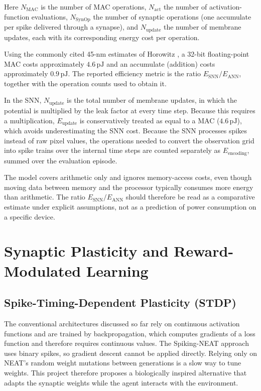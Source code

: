 Here $N_{\mathrm{MAC}}$ is the number of MAC operations, $N_{\mathrm{act}}$ the number of activation-function evaluations, $N_{\mathrm{SynOp}}$ the number of synaptic operations (one accumulate per spike delivered through a synapse), and $N_{\mathrm{update}}$ the number of membrane updates, each with its corresponding energy cost per operation.

Using the commonly cited 45-nm estimates of Horowitz \cite{horowitz2014computing}, a 32-bit floating-point MAC costs approximately $4.6\,\mathrm{pJ}$ and an accumulate (addition) costs approximately $0.9\,\mathrm{pJ}$. The reported efficiency metric is the ratio $E_{\mathrm{SNN}}/E_{\mathrm{ANN}}$, together with the operation counts used to obtain it.

In the SNN, $N_{\mathrm{update}}$ is the total number of membrane updates, in which the potential is multiplied by the leak factor at every time step. Because this requires a multiplication, $E_{\mathrm{update}}$ is conservatively treated as equal to a MAC ($4.6\,\mathrm{pJ}$), which avoids underestimating the SNN cost. Because the SNN processes spikes instead of raw pixel values, the operations needed to convert the observation grid into spike trains over the internal time steps are counted separately as $E_{\mathrm{encoding}}$, summed over the evaluation episode.

The model covers arithmetic only and ignores memory-access costs, even though moving data between memory and the processor typically consumes more energy than arithmetic. The ratio $E_{\mathrm{SNN}}/E_{\mathrm{ANN}}$ should therefore be read as a comparative estimate under explicit assumptions, not as a prediction of power consumption on a specific device.

\section{Synaptic Plasticity and Reward-Modulated Learning}

\subsection{Spike-Timing-Dependent Plasticity (STDP)}

The conventional architectures discussed so far rely on continuous activation functions and are trained by backpropagation, which computes gradients of a loss function and therefore requires continuous values. The Spiking-NEAT approach uses binary spikes, so gradient descent cannot be applied directly. Relying only on NEAT's random weight mutations between generations is a slow way to tune weights. This project therefore proposes a biologically inspired alternative that adapts the synaptic weights while the agent interacts with the environment.

